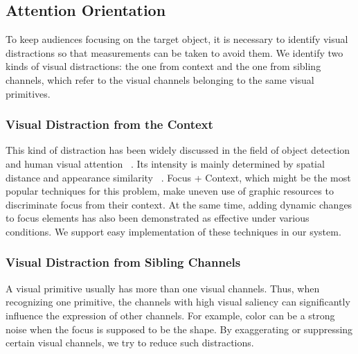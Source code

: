 
\subsection{Attention Orientation}
To keep audiences focusing on the target object, it is necessary to identify visual distractions so that measurements can be taken to avoid them. 
We identify two kinds of visual distractions: the one from context and the one from sibling channels, which refer to the visual channels belonging to the same visual primitives. 

\subsubsection{Visual Distraction from the Context}
This kind of distraction has been widely discussed in the field of object detection and human visual attention ~\cite{nothdurft_salience_2000, standage_modelling_2005}. Its intensity is mainly  determined by spatial distance and appearance similarity ~\cite{wolfe_guided_1994}. 
Focus + Context, which might be the most popular techniques for this problem, make uneven use of graphic resources to discriminate focus from their context. At the same time, adding dynamic changes to focus elements has also been demonstrated as effective under various conditions\cite{waldner_attractive_2014}. We support easy implementation of these techniques in our system. 

\subsubsection{Visual Distraction from Sibling Channels}
A visual primitive usually has more than one visual channels. Thus, when recognizing one primitive, the channels with high visual saliency can significantly influence the expression of other channels. For example, color can be a strong noise when the focus is supposed to be the shape. By exaggerating or suppressing certain visual channels, we try to reduce such distractions.


